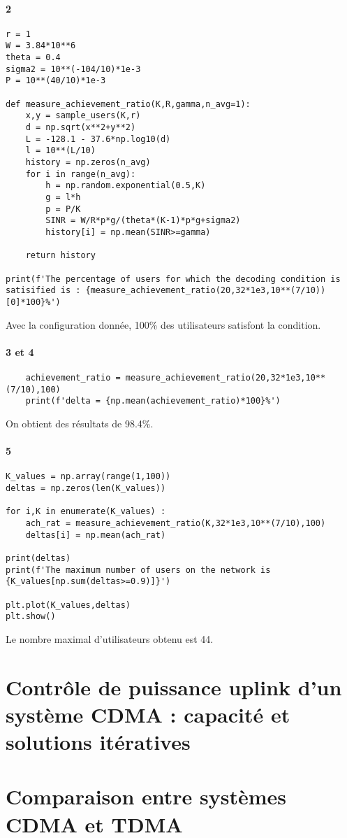 \documentclass[a4paper,11pt,2]{article}
\begin{document}
\paragraph{2}

\begin{center}
\begin{lstlisting}
r = 1
W = 3.84*10**6
theta = 0.4
sigma2 = 10**(-104/10)*1e-3
P = 10**(40/10)*1e-3

def measure_achievement_ratio(K,R,gamma,n_avg=1):
    x,y = sample_users(K,r)
    d = np.sqrt(x**2+y**2)
    L = -128.1 - 37.6*np.log10(d)
    l = 10**(L/10)
    history = np.zeros(n_avg)
    for i in range(n_avg):
        h = np.random.exponential(0.5,K)
        g = l*h
        p = P/K
        SINR = W/R*p*g/(theta*(K-1)*p*g+sigma2)
        history[i] = np.mean(SINR>=gamma)

    return history

print(f'The percentage of users for which the decoding condition is satisified is : {measure_achievement_ratio(20,32*1e3,10**(7/10))[0]*100}%')
\end{lstlisting}
\end{center}

Avec la configuration donnée, 100\% des utilisateurs satisfont la condition.

\paragraph{3 et 4}

\begin{center}
\begin{lstlisting}
	achievement_ratio = measure_achievement_ratio(20,32*1e3,10**(7/10),100)
	print(f'delta = {np.mean(achievement_ratio)*100}%')
\end{lstlisting}
\end{center}

On obtient des résultats de 98.4\%.

\paragraph{5}

\begin{center}
\begin{lstlisting}
K_values = np.array(range(1,100))
deltas = np.zeros(len(K_values))

for i,K in enumerate(K_values) :
    ach_rat = measure_achievement_ratio(K,32*1e3,10**(7/10),100)
    deltas[i] = np.mean(ach_rat)

print(deltas)
print(f'The maximum number of users on the network is {K_values[np.sum(deltas>=0.9)]}')

plt.plot(K_values,deltas)
plt.show()
\end{lstlisting}
\end{center}
Le nombre maximal d'utilisateurs obtenu est 44.

\section{Contrôle de puissance uplink d'un système CDMA : capacité et solutions itératives}

\section{Comparaison entre systèmes CDMA et TDMA}
\end{document}
